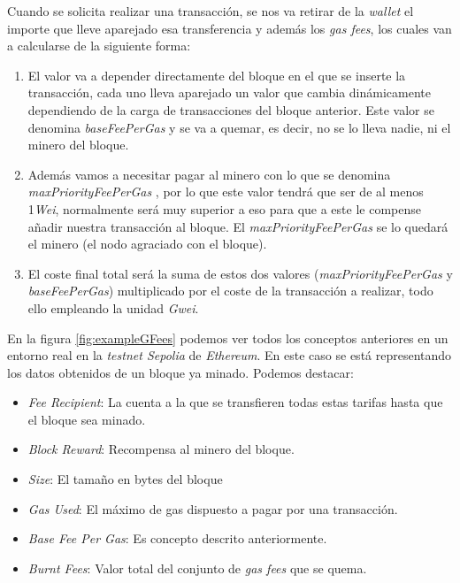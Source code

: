 Cuando se solicita realizar una transacción, se nos va retirar de la \textit{wallet} el importe que lleve aparejado esa transferencia y además los \textit{gas fees}, los cuales van a calcularse de la siguiente forma:

\begin{enumerate}
    \item El valor va a depender directamente del bloque en el que se inserte la transacción, cada uno lleva aparejado un valor que cambia dinámicamente dependiendo de la carga de transacciones del bloque anterior. Este valor se denomina \textit{baseFeePerGas} y se va a quemar, es decir, no se lo lleva nadie, ni el minero del bloque.
    \item Además vamos a necesitar pagar al minero con lo que se denomina \textit{maxPriorityFeePerGas} , por lo que este valor tendrá que ser de al menos 1\textit{Wei}, normalmente será muy superior a eso para que a este le compense añadir nuestra transacción al bloque. El \textit{maxPriorityFeePerGas} se lo quedará el minero (el nodo agraciado con el bloque).
    \item El coste final total será la suma de estos dos valores (\textit{maxPriorityFeePerGas} y  \textit{baseFeePerGas}) multiplicado por el coste de la transacción a realizar, todo ello empleando la unidad \textit{Gwei}.
\end{enumerate}


En la figura \ref{fig:exampleGFees} podemos ver todos los conceptos anteriores en un entorno real en la \textit{testnet Sepolia} de \textit{Ethereum}. En este caso se está representando los datos obtenidos de un bloque ya minado. Podemos destacar:
 \begin{itemize}
 \item \textit{Fee Recipient}: La cuenta a la que se transfieren todas estas tarifas hasta que el bloque sea minado.
 \item \textit{Block Reward}: Recompensa al minero del bloque.
 \item \textit{Size}: El tamaño en bytes del bloque
 \item \textit{Gas Used}: El máximo de gas dispuesto a pagar por una transacción.
 \item \textit{Base Fee Per Gas}: Es concepto descrito anteriormente.
 \item \textit{Burnt Fees}: Valor total del conjunto de \textit{gas fees} que se quema.
 \end{itemize}

